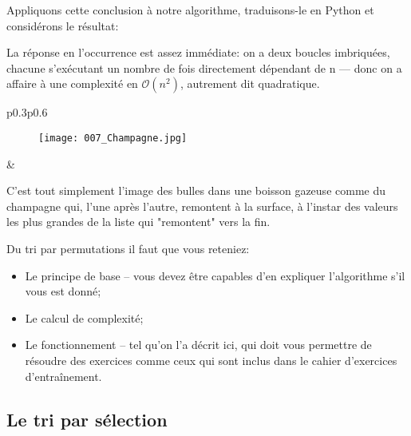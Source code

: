 \documentclass[12pt]{article}
\begin{document}
	Appliquons cette conclusion à notre algorithme, traduisons-le en Python et considérons le résultat:
	
	
	\begin{MaReponse}
		La réponse en l'occurrence est assez immédiate: on a deux boucles imbriquées, chacune s'exécutant un nombre de fois directement dépendant de n --- donc on a affaire à une complexité en $\mathcal{O}(n^2)$, autrement dit quadratique.
	\end{MaReponse}
	
	
	\begin{MaReponse}
		\begin{tabular}{p{0.3\textwidth}p{0.6\textwidth}}
			\begin{minipage}{\linewidth}
				\begin{figure}[H]
					\centering
					\texttt{[image: 007\_Champagne.jpg]}
				\end{figure}
			\end{minipage}
			&
			\begin{minipage}{\linewidth}
				C'est tout simplement l'image des bulles dans une boisson gazeuse comme du champagne qui, l'une après l'autre, remontent à la surface, à l'instar des valeurs les plus grandes de la liste qui "remontent" vers la fin.
			\end{minipage}
		\end{tabular}			
	\end{MaReponse}
	
	\begin{MonRet}
		Du tri par permutations il faut que vous reteniez:
		\begin{itemize}
			\item Le principe de base -- vous devez être capables d'en expliquer l'algorithme s'il vous est donné;
			\item Le calcul de complexité;
			\item Le fonctionnement -- tel qu'on l'a décrit ici, qui doit vous permettre de résoudre des exercices comme ceux qui sont inclus dans le cahier d'exercices d'entraînement.
		\end{itemize}
	\end{MonRet}
	
	\subsection{Le tri par sélection}
		
\end{document}
